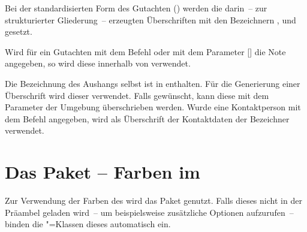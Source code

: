 \begin{Declaration}{}
\begin{Declaration}{}
\printdeclarationlist%
%
Bei der standardisierten Form des Gutachten () werden die 
darin~-- zur strukturierter Gliederung~-- erzeugten Überschriften mit den 
Bezeichnern ,  und  
gesetzt.
\end{Declaration}
\end{Declaration}

\begin{Declaration}{}
\printdeclarationlist%
%
Wird für ein Gutachten mit dem Befehl  oder mit 
dem Parameter [] die Note 
angegeben, so wird diese innerhalb von  verwendet.
\end{Declaration}

\begin{Declaration}{}
\begin{Declaration}{}
\printdeclarationlist%
%
Die Bezeichnung des Aushangs selbst ist in  enthalten. Für 
die Generierung einer Überschrift wird dieser verwendet. Falls gewünscht, kann 
diese mit dem Parameter  der Umgebung 
 überschrieben werden. Wurde eine Kontaktperson mit dem 
Befehl  angegeben, wird als Überschrift der Kontaktdaten 
der Bezeichner  verwendet.

\end{Declaration}
\end{Declaration}



\section{Das Paket  -- Farben im \CD}%
%
%
Zur Verwendung der Farben des \CDs wird das Paket  
genutzt. Falls dieses nicht in der Präambel geladen wird~-- um beispielsweise 
zusätzliche Optionen aufzurufen~-- binden die \TUDScript"=Klassen dieses 
automatisch ein.

